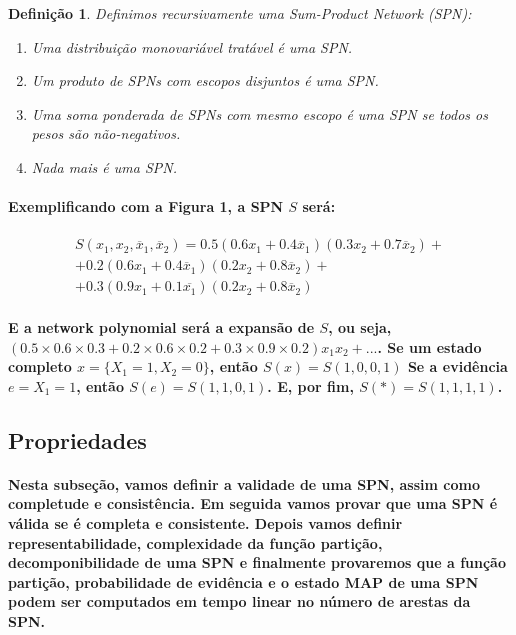 \documentclass[a4paper,10pt]{article}
\theoremstyle{plain}
\newtheorem{spn-def}{Definição}
\begin{document}
\begin{spn-def} Definimos recursivamente uma Sum-Product Network (SPN):
  \begin{enumerate}
    \item Uma distribuição monovariável tratável é uma SPN.
    \item Um produto de SPNs com escopos disjuntos é uma SPN.
    \item Uma soma ponderada de SPNs com mesmo escopo é uma SPN se todos os pesos são não-negativos.
    \item Nada mais é uma SPN.
  \end{enumerate}
\end{spn-def}

\paragraph{
  Exemplificando com a Figura 1, a SPN $S$ será:
}

\begin{equation}
  \begin{split}
    S(x_1,x_2,\overline{x}_1,\overline{x}_2)=0.5(0.6x_1 + 0.4\overline{x}_1)(0.3x_2 + 0.7
    \overline{x}_2) +\\
    + 0.2(0.6x_1 + 0.4\overline{x}_1)(0.2x_2 + 0.8\overline{x}_2) +\\
    + 0.3(0.9x_1 + 0.1\overline{x_1})(0.2x_2 + 0.8\overline{x}_2)\phantom{+}
  \end{split}
\end{equation}

\paragraph{
  E a network polynomial será a expansão de $S$, ou seja, $(0.5 \times 0.6 \times 0.3 + 0.2 \times
  0.6 \times 0.2 + 0.3 \times 0.9 \times 0.2)x_1x_2 + ...$. Se um estado completo $x = \{X_1 = 1,
  X_2 = 0\}$, então $S(x) = S(1, 0, 0, 1)$ Se a evidência $e={X_1=1}$, então $S(e)=S(1,1,0,1)$.
  E, por fim, $S(*) = S(1, 1, 1, 1)$.
}

\subsection{Propriedades}

\paragraph{
  Nesta subseção, vamos definir a validade de uma SPN, assim como completude e consistência. Em
  seguida vamos provar que uma SPN é válida se é completa e consistente. Depois vamos definir
  representabilidade, complexidade da função partição, decomponibilidade de uma SPN e finalmente
  provaremos que a função partição, probabilidade de evidência e o estado MAP\cite{report-1} de uma
  SPN podem ser computados em tempo linear no número de arestas da SPN.
}
\end{document}
